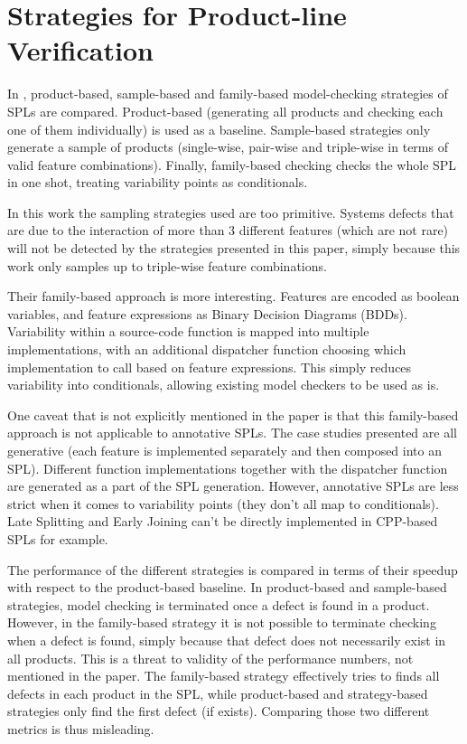 \documentclass[11pt]{article}
\begin{document}
\section{Strategies for Product-line Verification}

In \cite{Apel:2013}, product-based, sample-based and family-based model-checking strategies of SPLs are compared. Product-based (generating all products and checking each one of them individually) is used as a baseline. Sample-based strategies only generate a sample of products (single-wise, pair-wise and triple-wise in terms of valid feature combinations). Finally, family-based checking checks the whole SPL in one shot, treating variability points as conditionals.

In this work the sampling strategies used are too primitive. Systems defects that are due to the interaction of more than 3 different features (which are not rare) will not be detected by the strategies presented in this paper, simply because this work only samples up to triple-wise feature combinations.

Their family-based approach is more interesting. Features are encoded as boolean variables, and feature expressions as Binary Decision Diagrams (BDDs). Variability within a source-code function is mapped into multiple implementations, with an additional dispatcher function choosing which implementation to call based on feature expressions. This simply reduces variability into conditionals, allowing existing model checkers to be used as is.

One caveat that is not explicitly mentioned in the paper is that this family-based approach is not applicable to annotative SPLs. The case studies presented are all generative (each feature is implemented separately and then composed into an SPL). Different function implementations together with the dispatcher function are generated as a part of the SPL generation. However, annotative SPLs are less strict when it comes to variability points (they don't all map to conditionals). Late Splitting and Early Joining can't be directly implemented in CPP-based SPLs for example.

The performance of the different strategies is compared in terms of their speedup with respect to the product-based baseline. In product-based and sample-based strategies, model checking is terminated once a defect is found in a product. However, in the family-based strategy it is not possible to terminate checking when a defect is found, simply because that defect does not necessarily exist in all products. This is a threat to validity of the performance numbers, not mentioned in the paper. The family-based strategy effectively tries to finds all defects in each product in the SPL, while product-based and strategy-based strategies only find the first defect (if exists). Comparing those two different metrics is thus misleading.
\end{document}
